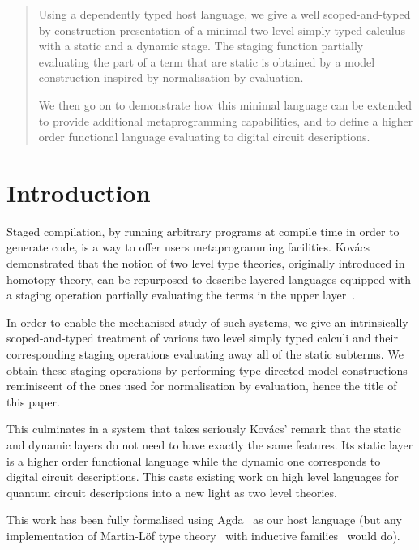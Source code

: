 \begin{abstract}
  Using a dependently typed host language, we give a well
  scoped-and-typed by construction presentation of a minimal
  two level simply typed calculus with a static and a dynamic
  stage.
  The staging function partially evaluating the part of a term
  that are static is obtained by a model construction inspired
  by normalisation by evaluation.

  We then go on to demonstrate how this minimal language can be
  extended to provide additional metaprogramming capabilities,
  and to define a higher order functional language evaluating
  to digital circuit descriptions.
\end{abstract}

\maketitle

\section{Introduction}

Staged compilation, by running arbitrary programs at compile
time in order to generate code, is a way to offer users
metaprogramming facilities.
%
Kov{\'{a}}cs demonstrated that the notion of two level
type theories, originally introduced in homotopy theory,
can be repurposed to describe layered languages equipped
with a staging operation partially evaluating the terms
in the upper layer~\cite{DBLP:journals/pacmpl/Kovacs22}.

In order to enable the mechanised study of such systems,
we give an intrinsically scoped-and-typed treatment of
various two level simply typed calculi and their
corresponding staging operations evaluating away all of
the static subterms.
%
We obtain these staging operations by performing type-directed
model constructions reminiscent of the ones used for normalisation
by evaluation, hence the title of this paper.

This culminates in a system that takes seriously Kov{\'{a}}cs'
remark that the static and dynamic layers do not need to have
exactly the same features. Its static layer is a higher order
functional language while the dynamic one corresponds to
digital circuit descriptions.
%
This casts existing work on high level languages for quantum
circuit descriptions into a new light as two level theories.

This work has been fully formalised using Agda~\cite{DBLP:conf/afp/Norell08}
as our host language (but any implementation
of Martin-Löf type theory~\cite{DBLP:books/daglib/0000395}
with inductive families~\cite{DBLP:journals/fac/Dybjer94}
would do).

